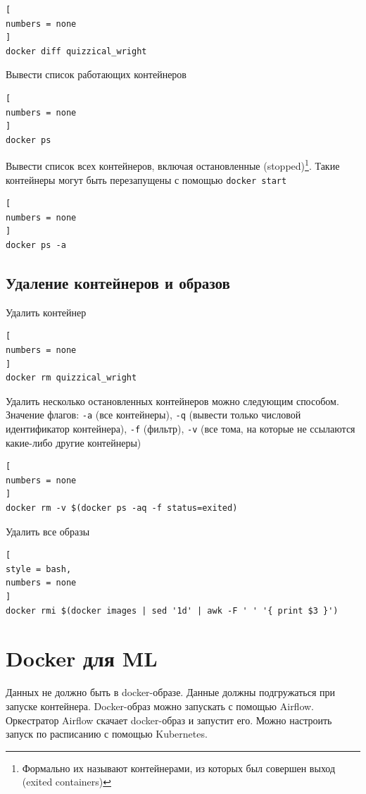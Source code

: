 \documentclass[%
	11pt,
	a4paper,
	utf8,
		]{article}
\begin{document}
\begin{lstlisting}[
numbers = none
]
docker diff quizzical_wright
\end{lstlisting}

Вывести список работающих контейнеров

\begin{lstlisting}[
numbers = none
]
docker ps
\end{lstlisting}

Вывести список всех контейнеров, включая остановленные (stopped)\footnote{Формально их называют контейнерами, из которых был совершен выход (exited containers)}. Такие контейнеры могут быть перезапущены с помощью \texttt{docker start}

\begin{lstlisting}[
numbers = none
]
docker ps -a
\end{lstlisting}

\subsection{Удаление контейнеров и образов}

Удалить контейнер 

\begin{lstlisting}[
numbers = none
]
docker rm quizzical_wright
\end{lstlisting}

Удалить несколько остановленных контейнеров можно следующим способом. Значение флагов: \texttt{-a} (все контейнеры), \texttt{-q} (вывести только числовой идентификатор контейнера), \texttt{-f} (фильтр), \texttt{-v} (все тома, на которые не ссылаются какие-либо другие контейнеры)

\begin{lstlisting}[
numbers = none
]
docker rm -v $(docker ps -aq -f status=exited)
\end{lstlisting}

Удалить все образы 
\begin{lstlisting}[
style = bash,
numbers = none
]
docker rmi $(docker images | sed '1d' | awk -F ' ' '{ print $3 }')
\end{lstlisting}

\section{Docker для ML}

Данных не должно быть в docker-образе. Данные должны подгружаться при запуске контейнера. Docker-образ можно запускать с помощью Airflow. Оркестратор Airflow скачает docker-образ и запустит его. Можно настроить запуск по расписанию с помощью Kubernetes.
\end{document}
